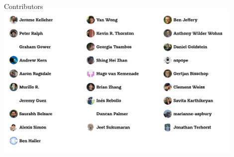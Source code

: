 \documentclass[landscape,a0paper,fontscale=0.5]{baposter}
\begin{document}
\begin{poster}
\begin{posterbox}[name=refs,column=2,above=bottom]{Contributors}
    \includegraphics[width=0.9\textwidth]{tskit-contributors}


\end{posterbox}


\end{poster}%
\end{document}
